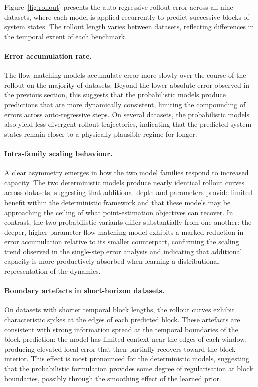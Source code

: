 Figure~\ref{fig:rollout} presents the auto-regressive rollout error across all nine datasets, where each model is applied recurrently to predict successive blocks of system states. The rollout length varies between datasets, reflecting differences in the temporal extent of each benchmark.

\paragraph{Error accumulation rate.} The flow matching models accumulate error more slowly over the course of the rollout on the majority of datasets. Beyond the lower absolute error observed in the previous section, this suggests that the probabilistic models produce predictions that are more dynamically consistent, limiting the compounding of errors across auto-regressive steps. On several datasets, the probabilistic models also yield less divergent rollout trajectories, indicating that the predicted system states remain closer to a physically plausible regime for longer.

\paragraph{Intra-family scaling behaviour.} A clear asymmetry emerges in how the two model families respond to increased capacity. The two deterministic models produce nearly identical rollout curves across datasets, suggesting that additional depth and parameters provide limited benefit within the deterministic framework and that these models may be approaching the ceiling of what point-estimation objectives can recover. In contrast, the two probabilistic variants differ substantially from one another: the deeper, higher-parameter flow matching model exhibits a marked reduction in error accumulation relative to its smaller counterpart, confirming the scaling trend observed in the single-step error analysis and indicating that additional capacity is more productively absorbed when learning a distributional representation of the dynamics.

\paragraph{Boundary artefacts in short-horizon datasets.} On datasets with shorter temporal block lengths, the rollout curves exhibit characteristic spikes at the edges of each predicted block. These artefacts are consistent with strong information spread at the temporal boundaries of the block prediction: the model has limited context near the edges of each window, producing elevated local error that then partially recovers toward the block interior. This effect is most pronounced for the deterministic models, suggesting that the probabilistic formulation provides some degree of regularisation at block boundaries, possibly through the smoothing effect of the learned prior.

